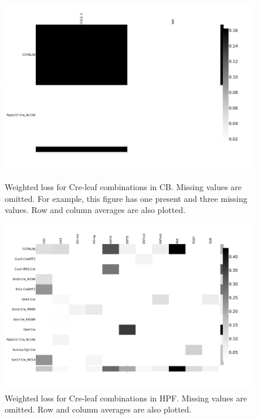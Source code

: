 \begin{figure}[H]
    \centering
    \includegraphics[width = 7in]{figs/lossdetails_512.png} 
    \label{fig:distances}
    \caption{Weighted loss for Cre-leaf combinations in CB.
    Missing values are omitted.
    For example, this figure has one present and three missing values.
    Row and column averages are also plotted.}
\end{figure}


\begin{figure}[H]
    \centering
    \includegraphics[width = 7in]{figs/lossdetails_1089.png} 
    \caption{Weighted loss for Cre-leaf combinations in HPF. Missing values are omitted.   Row and column averages are also plotted.}
\end{figure}


